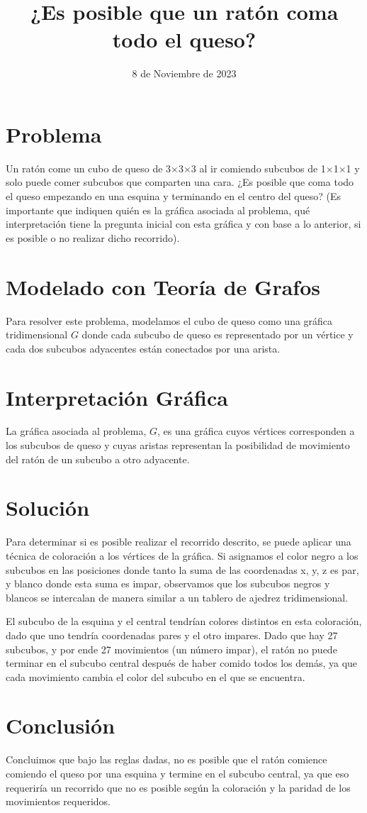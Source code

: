 \documentclass[12pt,spanish]{article}
\title{¿Es posible que un ratón coma todo el queso?}
\date{8 de Noviembre de 2023}
\begin{document}
\maketitle

\section{Problema}
Un ratón come un cubo de queso de 3×3×3 al ir comiendo subcubos de 1×1×1 y solo puede comer subcubos
que comparten una cara.  ¿Es posible que coma todo el queso empezando en una esquina y terminando en el
centro del queso? (Es importante que indiquen quién es la gráfica asociada al problema, qué interpretación
tiene la pregunta inicial con esta gráfica y con base a lo anterior, si es posible o no realizar dicho recorrido).
\section{Modelado con Teoría de Grafos}
Para resolver este problema, modelamos el cubo de queso como una gráfica tridimensional $G$ donde cada subcubo de queso es representado por un vértice y cada dos subcubos adyacentes están conectados por una arista.

\section{Interpretación Gráfica}
La gráfica asociada al problema, $G$, es una gráfica cuyos vértices corresponden a los subcubos de queso y cuyas aristas representan la posibilidad de movimiento del ratón de un subcubo a otro adyacente.

\section{Solución}
Para determinar si es posible realizar el recorrido descrito, se puede aplicar una técnica de coloración a los vértices de la gráfica. Si asignamos el color negro a los subcubos en las posiciones donde tanto la suma de las coordenadas x, y, z es par, y blanco donde esta suma es impar, observamos que los subcubos negros y blancos se intercalan de manera similar a un tablero de ajedrez tridimensional.

El subcubo de la esquina y el central tendrían colores distintos en esta coloración, dado que uno tendría coordenadas pares y el otro impares. Dado que hay 27 subcubos, y por ende 27 movimientos (un número impar), el ratón no puede terminar en el subcubo central después de haber comido todos los demás, ya que cada movimiento cambia el color del subcubo en el que se encuentra. 

\section{Conclusión}
Concluimos que bajo las reglas dadas, no es posible que el ratón comience comiendo el queso por una esquina y termine en el subcubo central, ya que eso requeriría un recorrido que no es posible según la coloración y la paridad de los movimientos requeridos.
\end{document}
